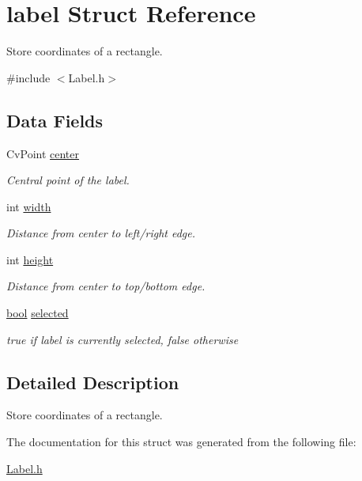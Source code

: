 \hypertarget{structlabel}{}\section{label Struct Reference}
\label{structlabel}


Store coordinates of a rectangle.  




{\ttfamily \#include $<$Label.\+h$>$}

\subsection*{Data Fields}
\begin{DoxyCompactItemize}
\item 
\mbox{\label{structlabel_aa0c8085e61f464c453f639ef50bb1c63}} 
Cv\+Point \hyperlink{structlabel_aa0c8085e61f464c453f639ef50bb1c63}{center}
\begin{DoxyCompactList}\small\item\em Central point of the label. \end{DoxyCompactList}\item 
\mbox{\label{structlabel_a703e8084ab832312dee89c061edae645}} 
int \hyperlink{structlabel_a703e8084ab832312dee89c061edae645}{width}
\begin{DoxyCompactList}\small\item\em Distance from center to left/right edge. \end{DoxyCompactList}\item 
\mbox{\label{structlabel_a69e6c5ce4d682d934e79679ff84c1bcb}} 
int \hyperlink{structlabel_a69e6c5ce4d682d934e79679ff84c1bcb}{height}
\begin{DoxyCompactList}\small\item\em Distance from center to top/bottom edge. \end{DoxyCompactList}\item 
\mbox{\label{structlabel_a401381623bae1c09af9ae326809a46d8}} 
\hyperlink{Label_8h_af6a258d8f3ee5206d682d799316314b1}{bool} \hyperlink{structlabel_a401381623bae1c09af9ae326809a46d8}{selected}
\begin{DoxyCompactList}\small\item\em true if label is currently selected, false otherwise \end{DoxyCompactList}\end{DoxyCompactItemize}


\subsection{Detailed Description}
Store coordinates of a rectangle. 

The documentation for this struct was generated from the following file\+:\begin{DoxyCompactItemize}
\item 
\hyperlink{Label_8h}{Label.\+h}\end{DoxyCompactItemize}

